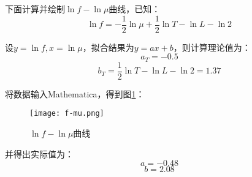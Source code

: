 \documentclass[11pt]{article}
\begin{document}
\begin{enumerate}
下面计算并绘制$\ln f-\ln \mu$曲线，已知：
\begin{equation*}
	\ln f=- \frac{1}{2}\ln \mu+\frac{1}{2} \ln T-\ln L-\ln2
\end{equation*}

设\(y=\ln f, x=\ln \mu\)，拟合结果为\(y=ax+b\)，则计算理论值为：
\begin{equation*}
	a_{T}=-0.5
\end{equation*}
\begin{equation*}
	b_{T}= \frac{1}{2}\ln T-\ln L-\ln2=1.37
\end{equation*}

将数据输入Mathematica，得到图\ref{fig:f-mu}：
\begin{figure}[htbp]
	\centering
	\texttt{[image: f-mu.png]}
	\caption{\(\ln f-\ln \mu\)曲线}
	\label{fig:f-mu}
\end{figure}

并得出实际值为：
\begin{equation*}
	a=-0.48
\end{equation*}
\begin{equation*}
	b=2.08
\end{equation*}
\end{enumerate}
\end{document}
